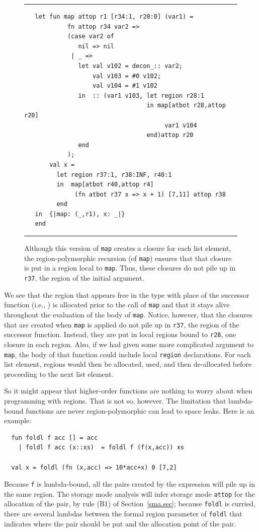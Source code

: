 \documentclass[12pt]{book}
\begin{document}
\begin{figure}
\hrule \medskip
\begin{verbatim}
   let fun map attop r1 [r34:1, r20:0] (var1) =
            fn attop r34 var2 =>
            (case var2 of
               nil => nil
             | _ =>
               let val v102 = decon_:: var2;
                   val v103 = #0 v102;
                   val v104 = #1 v102
               in  :: (var1 v103, let region r28:1
                                  in map[atbot r28,attop r20]
                                       var1 v104
                                  end)attop r20
               end
            );
       val x =
         let region r37:1, r38:INF, r40:1
         in  map[atbot r40,attop r4]
              (fn atbot r37 x => x + 1) [7,11] attop r38
         end
   in  {|map: (_,r1), x: _|}
   end
\end{verbatim}
\caption{Although this version of {\tt map} creates a closure for
  each list element, the region-polymorphic recursion (of {\tt map})
  ensures that that closure is put in a region local to {\tt map}.
  Thus, these closures do not pile up in {\tt r37}, the region of the
  initial argument.}
\medskip \hrule
\label{map.fig}
\end{figure}
We see that the region that appears free in the type with place of the
successor function (i.e., ) is allocated prior to the call
of {\tt map} and that it stays alive throughout the evaluation of the
body of {\tt map}. Notice, however, that the closures that are created
when {\tt map} is applied do not pile up in {\tt r37}, the region of
the successor function. Instead, they are put in local regions bound
to {\tt r28}, one closure in each region.  Also, if we had given some
more complicated argument to {\tt map}, the body of that function
could include local {\tt region} declarations. For each list element,
regions would then be allocated, used, and then de-allocated before
proceeding to the next list element.

So it might appear that higher-order functions are nothing to worry
about when programming with regions. That is not so, however. The
limitation that lambda-bound functions are never region-polymorphic
can lead to space leaks. Here is an example:
\begin{verbatim}
  fun foldl f acc [] = acc
    | foldl f acc (x::xs)  = foldl f (f(x,acc)) xs

  val x = foldl (fn (x,acc) => 10*acc+x) 0 [7,2]
\end{verbatim}
Because {\tt f} is lambda-bound, all the pairs created by the
expression  will pile up in the same region. The
storage mode analysis will infer storage mode {\tt attop} for the
allocation of the pair, by rule (B1) of Section~\ref{sma.sec}; because
{\tt foldl} is curried, there are several lambdas between the formal
region parameter of {\tt foldl} that indicates where the pair should
be put and the allocation point of the pair.
\end{document}

